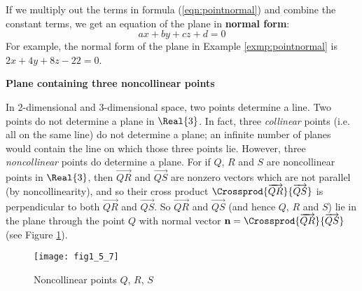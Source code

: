 If we multiply out the terms in formula (\ref{eqn:pointnormal}) and combine the constant terms, we get an
equation of the plane in \textbf{normal form}:
\begin{equation}
 ax + by + cz + d = 0
\end{equation}
For example, the normal form of the plane in Example \ref{exmp:pointnormal} is $2x + 4y + 8z - 22 = 0$.
\newpage
\par\noindent\textbf{\large{Plane containing three noncollinear points}}\normalsize\vspace{1.5mm}

In 2-dimensional and 3-dimensional space, two points determine a line. Two points do not determine a plane in
$\Real{3}$. In fact, three \emph{collinear} points (i.e. all on the same line)
do not determine a plane; an infinite number of planes would contain the line on which those three points lie.
However, three \emph{noncollinear} points do determine a plane. For if $Q$, $R$ and $S$ are noncollinear points in
$\Real{3}$, then $\overrightarrow{QR}$ and $\overrightarrow{QS}$ are  nonzero vectors which are not parallel (by
noncollinearity), and so their cross product $\Crossprod{\overrightarrow{QR}}{\overrightarrow{QS}}$ is perpendicular to
both $\overrightarrow{QR}$ and $\overrightarrow{QS}$. So $\overrightarrow{QR}$ and
$\overrightarrow{QS}$ (and hence $Q$, $R$ and $S$) lie in the plane through the point $Q$ with normal vector
$\textbf{n} = \Crossprod{\overrightarrow{QR}}{\overrightarrow{QS}}$ (see Figure \ref{fig:plane3pts}).

\begin{figure}[h]
 \begin{center}
  \texttt{[image: fig1\_5\_7]}
 \end{center}\vspace{-5mm}
 \caption[]{\quad Noncollinear points $Q$, $R$, $S$}
 \label{fig:plane3pts}
\end{figure}

